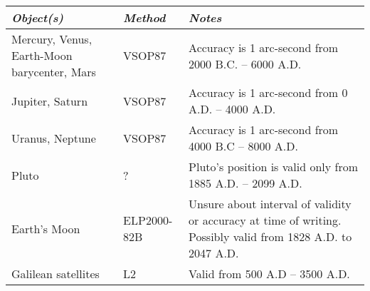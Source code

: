 \begin{longtabu} to \textwidth {X|l|X}
\toprule
\emph{Object(s)} & \emph{Method} & \emph{Notes}\tabularnewline
\midrule
Mercury, Venus, Earth-Moon barycenter, Mars & VSOP87 & Accuracy is 1 arc-second from 2000 B.C. -- 6000 A.D.\\
\midrule
Jupiter, Saturn & VSOP87 & Accuracy is 1 arc-second from 0 A.D. -- 4000 A.D.\\
\midrule
Uranus, Neptune & VSOP87 & Accuracy is 1 arc-second from 4000 B.C -- 8000 A.D.\\
\midrule
Pluto & ? & Pluto's position is valid only from 1885 A.D. -- 2099 A.D.\\
\midrule
Earth's Moon & ELP2000-82B & Unsure about interval of validity or accuracy at time of writing. Possibly valid from 1828 A.D. to 2047 A.D.\\
\midrule
Galilean satellites & L2 & Valid from 500 A.D -- 3500 A.D.\\
\bottomrule
\end{longtabu}





